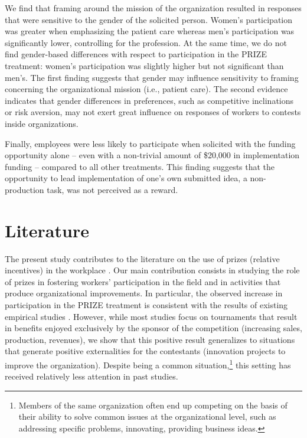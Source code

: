 \documentclass[12pt, titlepage]{article}
\begin{document}
We find that framing around the mission of the organization resulted in
responses that were sensitive to the gender of the solicited person.
Women's participation was greater when emphasizing the patient care
whereas men's participation was significantly lower, controlling for the
profession. At the same time, we do not find gender-based differences
with respect to participation in the PRIZE treatment: women's
participation was slightly higher but not significant than men's. The
first finding suggests that gender may influence sensitivity to framing
concerning the organizational mission (i.e., patient care). The second
evidence indicates that gender differences in preferences, such as
competitive inclinations or risk aversion, may not exert great influence
on responses of workers to contests inside organizations.

Finally, employees were less likely to participate when solicited with
the funding opportunity alone -- even with a non-trivial amount of
\$20,000 in implementation funding -- compared to all other treatments.
This finding suggests that the opportunity to lead implementation of
one's own submitted idea, a non-production task, was not perceived as a
reward.

\section{Literature}\label{literature}

The present study contributes to the literature on the use of prizes
(relative incentives) in the workplace \citep[among
others]{lazear1981rank, green1983comparison, mary1984economic}. Our main
contribution consists in studying the role of prizes in fostering
workers' participation in the field and in activities that produce
organizational improvements. In particular, the observed increase in
participation in the PRIZE treatment is consistent with the results of
existing empirical studies
\citep{bull1987tournaments, knoeber1994testing, eriksson1999executive, ehrenberg1990tournaments, terwiesch2008innovation, terwiesch2009innovation, boudreau2011incentives, boudreau2016performance}.
However, while most studies focus on tournaments that result in benefits
enjoyed exclusively by the sponsor of the competition (increasing sales,
production, revenues), we show that this positive result generalizes to
situations that generate positive externalities for the contestants
(innovation projects to improve the organization). Despite being a
common situation,\footnote{Members of the same organization often end up
  competing on the basis of their ability to solve common issues at the
  organizational level, such as addressing specific problems,
  innovating, providing business ideas.} this setting has received
relatively less attention in past studies.
\end{document}
